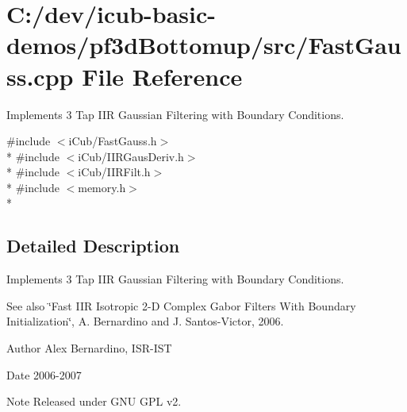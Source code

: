 \section{C\+:/dev/icub-\/basic-\/demos/pf3d\+Bottomup/src/\+Fast\+Gauss.cpp File Reference}
\label{FastGauss_8cpp}


Implements 3 Tap I\+IR Gaussian Filtering with Boundary Conditions.  


{\ttfamily \#include $<$i\+Cub/\+Fast\+Gauss.\+h$>$}\\*
{\ttfamily \#include $<$i\+Cub/\+I\+I\+R\+Gaus\+Deriv.\+h$>$}\\*
{\ttfamily \#include $<$i\+Cub/\+I\+I\+R\+Filt.\+h$>$}\\*
{\ttfamily \#include $<$memory.\+h$>$}\\*


\subsection{Detailed Description}
Implements 3 Tap I\+IR Gaussian Filtering with Boundary Conditions. 

\begin{DoxySeeAlso}{See also}
\char`\"{}\+Fast I\+I\+R Isotropic 2-\/\+D Complex Gabor Filters With Boundary Initialization\char`\"{}, A. Bernardino and J. Santos-\/\+Victor, 2006. 
\end{DoxySeeAlso}
\begin{DoxyAuthor}{Author}
Alex Bernardino, I\+S\+R-\/\+I\+ST 
\end{DoxyAuthor}
\begin{DoxyDate}{Date}
2006-\/2007 
\end{DoxyDate}
\begin{DoxyNote}{Note}
Released under G\+NU G\+PL v2. 
\end{DoxyNote}
